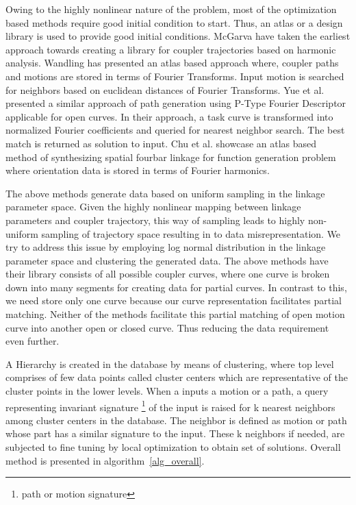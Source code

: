 \documentclass[twocolumn,10pt]{asme2e}
\begin{document}
Owing to the highly nonlinear nature of the problem, most of the optimization based methods require good initial condition to start.
Thus, an atlas or a design library is used to provide good initial conditions.
McGarva\cite{mcgarva1994} have taken the earliest approach towards creating a library for coupler trajectories based on harmonic analysis.
Wandling\cite{wandling2000} has presented an atlas based approach where, coupler paths and motions are stored in terms of Fourier Transforms.
Input motion is searched for neighbors based on euclidean distances of Fourier Transforms.
Yue et al.\cite{yue-pathgen2011} presented a similar approach of path generation using P-Type Fourier Descriptor applicable for open curves.
In their approach, a task curve is transformed into normalized Fourier coefficients and queried for nearest neighbor search.
The best match is returned as solution to input. Chu et al.\cite{chu2010} showcase an atlas based method of synthesizing spatial fourbar linkage for function generation problem where orientation data is stored in terms of Fourier harmonics.

The above methods generate data based on uniform sampling in the linkage parameter space.
Given the highly nonlinear mapping between linkage parameters and coupler trajectory, this way of sampling leads to highly non-uniform sampling of trajectory space resulting in to data misrepresentation.
We try to address this issue by employing log normal distribution in the linkage parameter space and clustering the generated data.
The above methods have their library consists of all possible coupler curves, where one curve is broken down into many segments for creating data for partial curves.
In contrast to this, we need store only one curve because our curve representation facilitates partial matching.
Neither of the methods facilitate this partial matching of open motion curve into another open or closed curve.
Thus reducing the data requirement even further.

A Hierarchy is created in the database by means of clustering, where top level comprises of few data points called cluster centers which are representative of the cluster points in the lower levels.
When a inputs a motion or a path, a query representing invariant signature \footnote{path or motion signature} of the input is raised for k nearest neighbors among cluster centers in the database.
The neighbor is defined as motion or path whose part has a similar signature to the input. These k neighbors if needed, are subjected to fine tuning by local optimization to obtain set of solutions. Overall method is presented in algorithm~\ref{alg_overall}.
\end{document}
